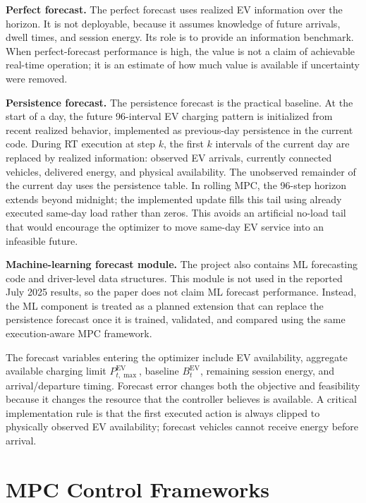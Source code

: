 \documentclass[final,5p,times]{elsarticle}
\newcommand{\EV}{\mathrm{EV}}
\begin{document}
\textbf{Perfect forecast.} The perfect forecast uses realized EV information over the horizon. It is not deployable, because it assumes knowledge of future arrivals, dwell times, and session energy. Its role is to provide an information benchmark. When perfect-forecast performance is high, the value is not a claim of achievable real-time operation; it is an estimate of how much value is available if uncertainty were removed.

\textbf{Persistence forecast.} The persistence forecast is the practical baseline. At the start of a day, the future 96-interval EV charging pattern is initialized from recent realized behavior, implemented as previous-day persistence in the current code. During RT execution at step $k$, the first $k$ intervals of the current day are replaced by realized information: observed EV arrivals, currently connected vehicles, delivered energy, and physical availability. The unobserved remainder of the current day uses the persistence table. In rolling MPC, the 96-step horizon extends beyond midnight; the implemented update fills this tail using already executed same-day load rather than zeros. This avoids an artificial no-load tail that would encourage the optimizer to move same-day EV service into an infeasible future.

\textbf{Machine-learning forecast module.} The project also contains ML forecasting code and driver-level data structures. This module is not used in the reported July 2025 results, so the paper does not claim ML forecast performance. Instead, the ML component is treated as a planned extension that can replace the persistence forecast once it is trained, validated, and compared using the same execution-aware MPC framework.

The forecast variables entering the optimizer include EV availability, aggregate available charging limit $P_{t,\max}^{\EV}$, baseline $B_t^{\EV}$, remaining session energy, and arrival/departure timing. Forecast error changes both the objective and feasibility because it changes the resource that the controller believes is available. A critical implementation rule is that the first executed action is always clipped to physically observed EV availability; forecast vehicles cannot receive energy before arrival.

\section{MPC Control Frameworks}
\label{sec:mpc_frameworks}
\end{document}
